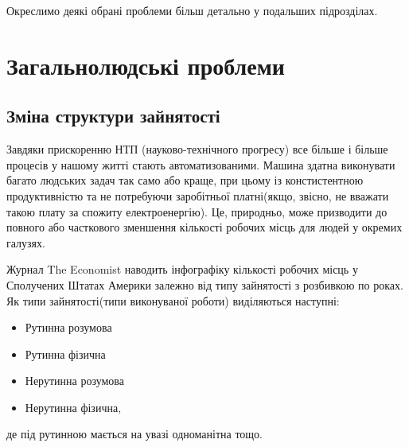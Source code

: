         Окреслимо деякі обрані проблеми більш детально у подальших підрозділах.

    \section{Загальнолюдські проблеми}\label{sec:world}


    \subsection{Зміна структури зайнятості}

        Завдяки прискоренню НТП (науково-технічного прогресу) все більше і більше процесів 
        у нашому житті стають автоматизованими. Машина здатна виконувати багато людських задач так само або краще,
        при цьому із констистентною продуктивністю та не потребуючи заробітньої платні(якщо, звісно, не вважати такою плату за
        спожиту електроенергію). Це, природньо, може призводити до повного або часткового зменшення кількості робочих місць для
        людей у окремих галузях.

        Журнал The Economist наводить інфографіку \cite{econinfo} кількості робочих місць у Сполучених Штатах Америки залежно від типу зайнятості
        з розбивкою по роках. Як типи зайнятості(типи виконуваної роботи) виділяються наступні:

        \begin{itemize}
            \item Рутинна розумова
            \item Рутинна фізична
            \item Нерутинна розумова
            \item Нерутинна фізична,
        \end{itemize}

        де під рутинною мається на увазі одноманітна тощо.

          

